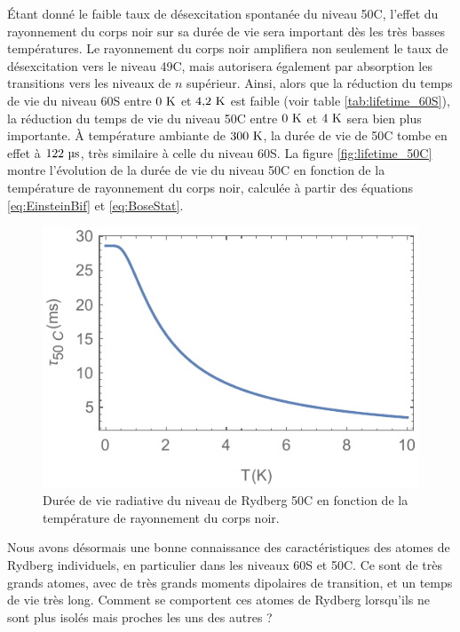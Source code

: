 Étant donné le faible taux de désexcitation spontanée du niveau 50C, l'effet du rayonnement du corps noir sur sa durée de vie sera important dès les très basses températures.
Le rayonnement du corps noir amplifiera non seulement le taux de désexcitation vers le niveau 49C, mais autorisera également par absorption les transitions vers les niveaux de $n$ supérieur.
Ainsi, alors que la réduction du temps de vie du niveau 60S entre $\numv{0}\si{\kelvin}$ et $\numv{4.2}\si{\kelvin}$ est faible (voir table \ref{tab:lifetime_60S}), la réduction du temps de vie du niveau 50C entre $\numv{0}\si{\kelvin}$ et $\numv{4}\si{\kelvin}$ sera bien plus importante.
\`A température ambiante de $\numv{300}\si{\kelvin}$, la durée de vie de 50C tombe en effet à $\numv{122}\si{\micro\second}$, très similaire à celle du niveau 60S.
La figure \eqref{fig:lifetime_50C} montre l'évolution de la durée de vie du niveau 50C en fonction de la température de rayonnement du corps noir, calculée à partir des équations \eqref{eq:EinsteinBif} et \eqref{eq:BoseStat}.

\begin{figure}[!h]
	\centering
	\includegraphics[width=0.6\linewidth]{figures/lifetime_50C}
	\caption[Durée de vie du niveau 50C]{Durée de vie radiative du niveau de Rydberg 50C en fonction de la température de rayonnement du corps noir.}
	\label{fig:lifetime_50C}
\end{figure}


\bigskip

Nous avons désormais une bonne connaissance des caractéristiques des atomes de Rydberg individuels, en particulier dans les niveaux 60S et 50C.
Ce sont de très grands atomes, avec de très grands moments dipolaires de transition, et un temps de vie très long.
Comment se comportent ces atomes de Rydberg lorsqu'ils ne sont plus isolés mais proches les uns des autres ?

